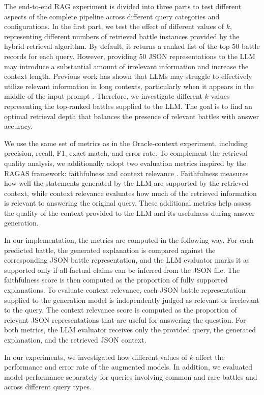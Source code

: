 The end-to-end RAG experiment is divided into three parts to test different aspects of the complete pipeline across different query categories and configurations. In the first part, we test the effect of different values of $k$, representing different numbers of retrieved battle instances provided by the hybrid retrieval algorithm. By default, it returns a ranked list of the top 50 battle records for each query. However, providing 50 JSON representations to the LLM may introduce a substantial amount of irrelevant information and increase the context length. Previous work has shown that LLMs may struggle to effectively utilize relevant information in long contexts, particularly when it appears in the middle of the input prompt \citep{liu2024lostinthemiddle}. Therefore, we investigate different $k$-values representing the top-ranked battles supplied to the LLM. The goal is to find an optimal retrieval depth that balances the presence of relevant battles with answer accuracy.

We use the same set of metrics as in the Oracle-context experiment, including precision, recall, F1, exact match, and error rate. To complement the retrieval quality analysis, we additionally adopt two evaluation metrics inspired by the RAGAS framework: faithfulness and context relevance \citep{es2024ragas}. Faithfulness measures how well the statements generated by the LLM are supported by the retrieved context, while context relevance evaluates how much of the retrieved information is relevant to answering the original query. These additional metrics help assess the quality of the context provided to the LLM and its usefulness during answer generation.

In our implementation, the metrics are computed in the following way. For each predicted battle, the generated explanation is compared against the corresponding JSON battle representation, and the LLM evaluator marks it as supported only if all factual claims can be inferred from the JSON file. The faithfulness score is then computed as the proportion of fully supported explanations. To evaluate context relevance, each JSON battle representation supplied to the generation model is independently judged as relevant or irrelevant to the query. The context relevance score is computed as the proportion of relevant JSON representations that are useful for answering the question. For both metrics, the LLM evaluator receives only the provided query, the generated explanation, and the retrieved JSON context. 

In our experiments, we investigated how different values of $k$ affect the performance and error rate of the augmented models. In addition, we evaluated model performance separately for queries involving common and rare battles and across different query types.
